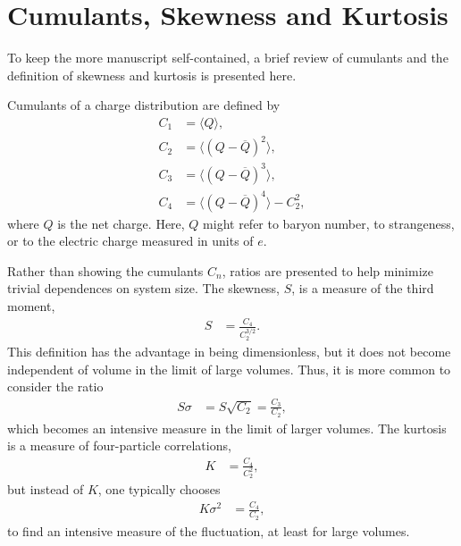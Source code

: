 \documentclass[aps,prc,nofootinbib,showpacs,superscriptaddress,groupedaddress]{revtex4-1}
\begin{document}
\section{Cumulants, Skewness and Kurtosis}

To keep the more manuscript self-contained, a brief review of cumulants and the definition of skewness and kurtosis is presented here.

Cumulants of a charge distribution are defined by 
\begin{eqnarray}
C_1&=\langle Q\rangle,\\
C_2&=\langle(Q-\overline{Q})^2\rangle,\\
C_3&=\langle(Q-\overline{Q})^3\rangle,\\
C_4&=\langle(Q-\overline{Q})^4\rangle-C_2^2,
\end{eqnarray}
where $Q$ is the net charge. Here, $Q$ might refer to baryon number, to strangeness, or to the electric charge measured in units of $e$.

Rather than showing the cumulants $C_n$, ratios are presented to help minimize trivial dependences on system size. The skewness, $S$, is a measure of the third moment,
\begin{eqnarray}
S&=\frac{C_4}{C_2^{3/2}}.
\end{eqnarray}
This definition has the advantage in being dimensionless, but it does not become independent of volume in the limit of large volumes. Thus, it is more common to consider the ratio
\begin{eqnarray}
S\sigma&=S\sqrt{C_2}=\frac{C_3}{C_2},
\end{eqnarray}
which becomes an intensive measure in the limit of larger volumes. The kurtosis is a measure of four-particle correlations,
\begin{eqnarray}
K&=\frac{C_4}{C_2^2},
\end{eqnarray}
but instead of $K$, one typically chooses
\begin{eqnarray}
K\sigma^2&=\frac{C_4}{C_2},
\end{eqnarray}
to find an intensive measure of the fluctuation, at least for large volumes. 
\end{document}
